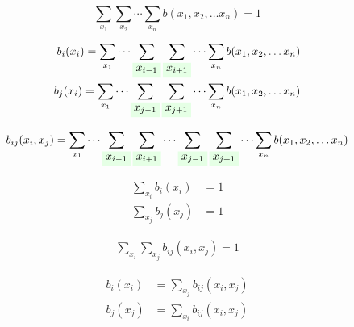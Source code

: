 \documentclass[fleqn,leqno]{article}
\newcommand{\highlight}[1]{\colorbox{green!10}{$\displaystyle#1$}}
\begin{document}
\begin{equation} \label{eq:probability_sum_b}
\sum_{x_1} \sum_{x_2} \cdots \sum_{x_n}  b(x_1, x_2, \dots x_n) = 1
\end{equation}

\begin{equation} \label{eq:marginal_probabilities_one_node_b}
\begin{split}
b_i(x_i) = \sum_{x_1} \cdots \sum_{ \highlight{ x_{i - 1} } } \sum_{ \highlight{ x_{i + 1} } } \cdots \sum_{x_n} b(x_1, x_2, \dots x_n) \\
b_j(x_i) = \sum_{x_1} \cdots \sum_{ \highlight{ x_{j - 1} } } \sum_{ \highlight{ x_{j + 1} } } \cdots \sum_{x_n} b(x_1, x_2, \dots x_n) \\
\end{split}
\end{equation}

\begin{equation} \label{eq:marginal_probabilities_two_nodes_b}
\begin{split}
b_{ij}(x_i, x_j) = \sum_{x_1} \cdots \sum_{ \highlight{ x_{i - 1} } } \sum_{ \highlight{ x_{i + 1} } } \cdots \sum_{ \highlight{ x_{j - 1} } } \sum_{ \highlight{ x_{j + 1} } } \cdots \sum_{x_n} b(x_1, x_2, \dots x_n)
\end{split}
\end{equation}

\begin{equation} \label{eq:sum_over_states_of_one_node_marginal_probabilities_b}
\begin{split}
\sum_{x_i} b_i(x_i) & = 1 \\
\sum_{x_j} b_j(x_j) & = 1
\end{split}
\end{equation}

\begin{equation} \label{eq:sum_over_states_of_two_node_marginal_probabilities_b}
\begin{split}
\sum_{x_i} \sum_{x_j} b_{ij}(x_i, x_j) = 1
\end{split}
\end{equation}

\begin{equation} \label{eq:one_node_marginal_probabilities_from_two_node_marginal_probabilities_b}
\begin{split}
b_i(x_i) & = \sum_{x_j} b_{ij}(x_i, x_j) \\
b_j(x_j) & = \sum_{x_i} b_{ij}(x_i, x_j) \\
\end{split}
\end{equation}
\end{document}
